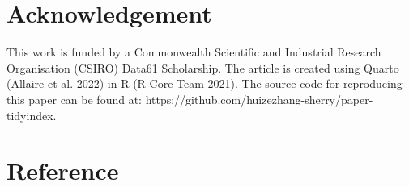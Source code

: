 \documentclass[
]{interact}
\begin{document}
\hypertarget{acknowledgement}{%
\section{Acknowledgement}\label{acknowledgement}}

This work is funded by a Commonwealth Scientific and Industrial Research
Organisation (CSIRO) Data61 Scholarship. The article is created using
Quarto (Allaire et al. 2022) in R (R Core Team 2021). The source code
for reproducing this paper can be found at:
https://github.com/huizezhang-sherry/paper-tidyindex.

\hypertarget{reference}{%
\section*{Reference}\label{reference}}
\end{document}

